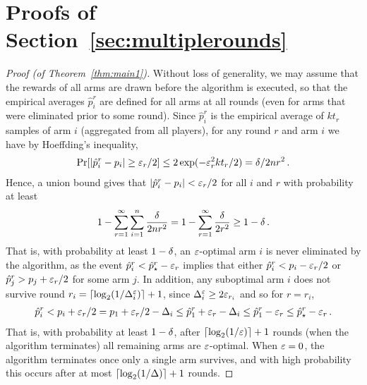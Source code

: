 \documentclass{article} %
\newcommand{\phat}{\hat{p}}
\newcommand{\Dele}{\Del^{\eps}}
\begin{document}
\section{Proofs of Section~\ref{sec:multiplerounds}}



\begin{proof}[Proof (of Theorem~\ref{thm:main1})]
Without loss of generality, we may assume that the rewards of all arms are drawn before the algorithm is executed, so that the empirical averages $\phat_i^r$ are defined for all arms at all rounds (even for arms that were eliminated prior to some round).
Since $\phat_i^r$ is the empirical average of $k t_r$ samples of arm $i$ (aggregated from all players),
for any round $r$ and arm $i$ we have by Hoeffding's inequality,
\begin{align*}
	\Pr[\abs{\phat_i^r - p_i} \ge \eps_r/2]
	\le 2 \exp(-\eps_r^2 k t_r/2)
	= \del / 2n r^2 \,.
\end{align*}
Hence, a union bound gives that $\abs{\phat_i^r - p_i} < \eps_r/2$ for all $i$ and $r$ with probability at least
\begin{align*}
	1 - \sum_{r=1}^{\infty} \sum_{i=1}^{n} \frac{\delta}{2n r^2}
	= 1 - \sum_{r=1}^{\infty} \frac{\delta}{2 r^2}
	\ge 1-\delta \,.
\end{align*}
That is, with probability at least $1-\delta$, an $\varepsilon$-optimal arm $i$ is never eliminated by the algorithm, as the event $\phat_i^r < \phat_{\st}^r - \eps_r$ implies that either $\phat_i^r < p_i - \eps_r/2$ or $\phat_j^r > p_j + \eps_r/2$ for some arm $j$.
In addition, any suboptimal arm $i$ does not survive round $r_i = \ceil{\log_2(1/\Dele_i)} + 1$, since $\Dele_i \ge 2 \eps_{r_i}$ and so for $r = r_i$,
\begin{align*}
	\phat_i^{r}
	< p_i + \eps_{r}/2 
	= p_1 + \eps_{r}/2 - \Del_i 
	\le \phat_1^{r} + \eps_{r} - \Del_i
	\le \phat_1^{r} - \eps_{r} 
	\le \phat_\st^{r} - \eps_{r} \,.
\end{align*}
That is, with probability at least $1-\delta$, after $\lceil\log_2(1/\varepsilon)\rceil + 1$ rounds (when the algorithm terminates) all remaining arms are $\varepsilon$-optimal.  
When $\varepsilon=0$, the algorithm terminates once only a single arm survives, and with high probability this occurs after at most $\lceil\log_2(1/\Delta)\rceil + 1$ rounds.



\end{proof}
\end{document}
